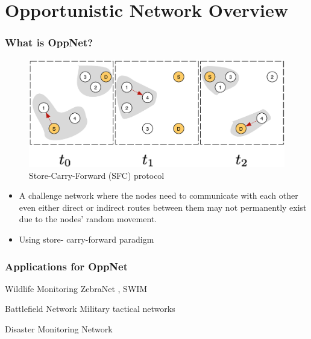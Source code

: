 \documentclass{beamer}
\begin{document}
\section{Opportunistic Network Overview}
\begin{frame}
	\frametitle{What is OppNet?}
	\begin{figure}
		\centering
		\includegraphics[width=0.7\linewidth]{Figures_Present/SFC}
		\caption{Store-Carry-Forward (SFC) protocol}
		\label{fig:SFC}
	\end{figure}
\begin{itemize}
	\item A challenge network where the nodes need to communicate with each other even either direct or indirect routes between them may not permanently exist due to the nodes’ random movement. 
	\item Using store- carry-forward paradigm 
\end{itemize}

\end{frame}
\begin{frame}
	\frametitle{Applications for OppNet}
	
	\begin{block}{Wildlife Monitoring}
		ZebraNet \cite{zebranet:2004}, SWIM \cite{Small2003} 
	\end{block}
	
	\begin{block}{Battlefield Network}
		Military tactical networks \cite{Scott2005} \cite{Kerdsri2013} 
	\end{block}
	
	\begin{block}{Disaster Monitoring Network}
	\end{block}

\end{frame}


\end{document}
